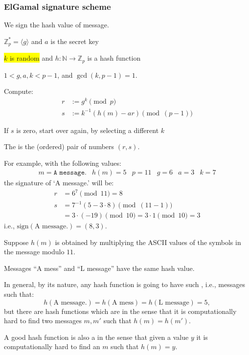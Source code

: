 \begin{frame}
\frametitle{ElGamal signature scheme}

We sign the hash value of message.

$\mathbb{Z}_p^*=\langle g\rangle$ and $a$ is the secret key

\colorbox{yellow}{$k$ is random} and
$h:\mathbb{N}\longrightarrow\mathbb{Z}_p$ is a hash function

$1<g,a,k<p-1$, and $\gcd(k,p-1)=1$.

Compute:
\begin{align*}
r &:= g^k\pmod p \\
s &:= k^{-1}(h(m)-ar)\pmod{(p-1)}
\end{align*}

If $s$ is zero, start over again, by selecting a different $k$

The  is the (ordered) pair of numbers $(r,s)$.  
\end{frame}

\begin{frame}

For example, with the following values:
$$
\begin{array}{llllll}
m = \texttt{A message.}
& h(m) = 5
& p = 11
& g = 6
& a = 3
& k = 7
\end{array}
$$
the signature of `A message.' will be:
\begin{align*}
r &= 6^7\pmod{11}=8 \\
s &= 7^{-1}(5-3\cdot 8)\pmod{(11-1)} \\
  &= 3\cdot(-19)\pmod{10}=3\cdot 1\pmod{10}=3
\end{align*}
i.e., $\text{sign}(\text{A message.})=(8,3)$.
\end{frame}

\begin{frame}

Suppose $h(m)$ is obtained by multiplying the ASCII values of the
symbols in the message modulo $11$.

Messages ``A mess'' and ``L message'' have the same hash value.  

In general, by its nature, any
hash function is going to have such , i.e., messages
such that:
$$
h(\text{A message.})=h(\text{A mess})=h(\text{L message})=5,
$$
but there are hash functions which are  in
the sense that it is computationally hard to find two messages $m,m'$
such that $h(m)=h(m')$.  

A good hash function is also a  in the sense that given a value $y$ it is computationally
hard to find an $m$ such that $h(m)=y$.

\end{frame}

